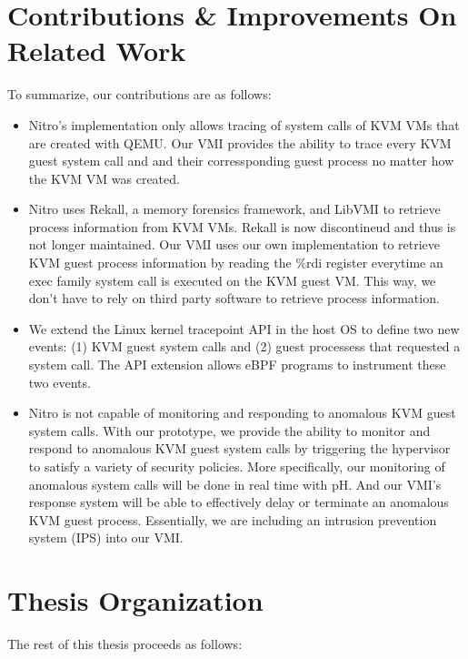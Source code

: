 \documentclass{report}
\begin{document}
\begin{spacing}{1.5}
\section{Contributions \& Improvements On Related Work}

{\large
To summarize, our contributions are as follows:

\begin{itemize}
  \item Nitro's implementation only allows tracing of system calls of KVM VMs that are created with QEMU. Our VMI provides the ability to trace every KVM guest system call and and their corressponding guest process no matter how the KVM VM was created.

  \item Nitro uses Rekall, a memory forensics framework, and LibVMI to retrieve process information from KVM VMs. Rekall is now discontineud and thus is not longer maintained. Our VMI uses our own implementation to retrieve KVM guest process information by reading the \%rdi register everytime an exec family system call is executed on the KVM guest VM. This way, we don't have to rely on third party software to retrieve process information.
  
  \item We extend the Linux kernel tracepoint API in the host OS to define two new events: (1) KVM guest system calls and (2) guest processess that requested a system call. The API extension allows eBPF programs to instrument these two events.
  
  \item Nitro is not capable of monitoring and responding to anomalous KVM guest system calls. With our prototype, we provide the ability to monitor and respond to anomalous KVM guest system calls by triggering the hypervisor to satisfy a variety of security policies. More specifically, our monitoring of anomalous system calls will be done in real time with pH. And our VMI's response system will be able to effectively delay or terminate an anomalous KVM guest process. Essentially, we are including an intrusion prevention system (IPS) into our VMI. 
\newline  
\end{itemize}
}









\section{Thesis Organization}
{\large
The rest of this thesis proceeds as follows:

}
\end{spacing}
\end{document}
